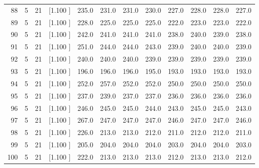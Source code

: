 \documentclass[12pt,a4paper]{article}
\begin{document}
\begin{center}
{\begin{tabular}{r r r r r r r r r r r r}
  88&  5& 21&[1.100     ]&   235.0&   231.0&   231.0&   230.0&   227.0&   228.0&   228.0&   227.0\\[-0.02in]
  89&  5& 21&[1.100     ]&   228.0&   225.0&   225.0&   225.0&   222.0&   223.0&   223.0&   222.0\\[-0.02in]
  90&  5& 21&[1.100     ]&   242.0&   241.0&   241.0&   241.0&   238.0&   240.0&   239.0&   238.0\\[-0.02in]
  91&  5& 21&[1.100     ]&   251.0&   244.0&   244.0&   243.0&   239.0&   240.0&   240.0&   239.0\\[-0.02in]
  92&  5& 21&[1.100     ]&   240.0&   240.0&   240.0&   239.0&   239.0&   239.0&   239.0&   239.0\\[-0.02in]
  93&  5& 21&[1.100     ]&   196.0&   196.0&   196.0&   195.0&   193.0&   193.0&   193.0&   193.0\\[-0.02in]
  94&  5& 21&[1.100     ]&   252.0&   257.0&   252.0&   252.0&   250.0&   250.0&   250.0&   250.0\\[-0.02in]
  95&  5& 21&[1.100     ]&   237.0&   239.0&   237.0&   237.0&   236.0&   236.0&   236.0&   236.0\\[-0.02in]
  96&  5& 21&[1.100     ]&   246.0&   245.0&   245.0&   244.0&   243.0&   245.0&   245.0&   243.0\\[-0.02in]
  97&  5& 21&[1.100     ]&   267.0&   247.0&   247.0&   247.0&   246.0&   247.0&   247.0&   246.0\\[-0.02in]
  98&  5& 21&[1.100     ]&   226.0&   213.0&   213.0&   212.0&   211.0&   212.0&   212.0&   211.0\\[-0.02in]
  99&  5& 21&[1.100     ]&   205.0&   204.0&   204.0&   204.0&   203.0&   204.0&   204.0&   203.0\\[-0.02in]
 100&  5& 21&[1.100     ]&   222.0&   213.0&   213.0&   213.0&   212.0&   213.0&   213.0&   212.0\\[-0.02in]

\hline
\end{tabular}}
\end{center}
\end{document}
